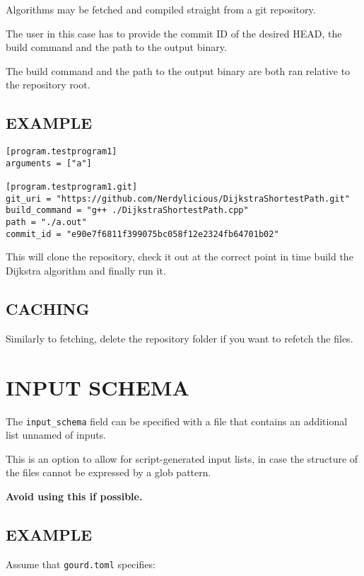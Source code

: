 \documentclass[a4paper,english]{article}
\begin{document}
\begin{adjustwidth}{18pt}{0pt}
        Algorithms may be fetched and compiled straight from a git repository.

        The user in this case has to provide the commit ID of the desired HEAD,
        the build command and the path to the output binary.

        The build command and the path to the output binary are both ran relative
        to the repository root.

        \subsection{EXAMPLE}

            \begin{verbatim}
[program.testprogram1]
arguments = ["a"]

[program.testprogram1.git]
git_uri = "https://github.com/Nerdylicious/DijkstraShortestPath.git"
build_command = "g++ ./DijkstraShortestPath.cpp"
path = "./a.out"
commit_id = "e90e7f6811f399075bc058f12e2324fb64701b02"
            \end{verbatim}
            This will clone the repository, check it out at the correct point in time
            build the Dijkstra algorithm and finally run it.

        \subsection{CACHING}

            Similarly to fetching, delete the repository folder if you want to refetch the files.

    \section{INPUT SCHEMA}

        The \texttt{input\_schema} field can be specified with a file that contains
        an additional list unnamed of inputs.

        This is an option to allow for script-generated input lists, in case
        the structure of the files cannot be expressed by a glob pattern.

        \textbf{Avoid using this if possible.}


        \subsection{EXAMPLE}

            Assume that \texttt{gourd.toml} specifies:


\end{adjustwidth}
\end{document}
